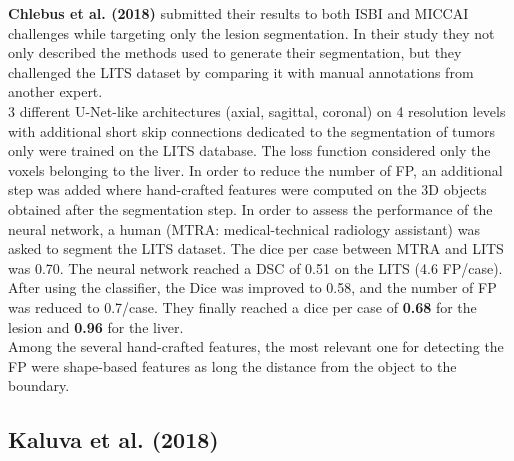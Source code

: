 \textbf{Chlebus et al. (2018)} submitted their results to both ISBI and
MICCAI challenges while targeting only the lesion segmentation. In their
study they not only described the methods used to generate their
segmentation, but they challenged the LITS dataset by comparing it with
manual annotations from another expert.\\
3 different U-Net-like architectures (axial, sagittal, coronal) on 4
resolution levels with additional short skip connections dedicated to
the segmentation of tumors only were trained on the LITS database. The
loss function considered only the voxels belonging to the liver. In
order to reduce the number of FP, an additional step was added where
hand-crafted features were computed on the 3D objects obtained after the
segmentation step. In order to assess the performance of the neural
network, a human (MTRA: medical-technical radiology assistant) was asked
to segment the LITS dataset. The dice per case between MTRA and LITS was
0.70. The neural network reached a DSC of 0.51 on the LITS (4.6
FP/case). After using the classifier, the Dice was improved to 0.58, and
the number of FP was reduced to 0.7/case. They finally reached a dice
per case of \textbf{0.68} for the lesion and \textbf{0.96} for the
liver.\\
Among the several hand-crafted features, the most relevant one for
detecting the FP were shape-based features as long the distance from the
object to the boundary.

\subsection*{Kaluva et al. (2018)}\label{kaluva-et-al.-2018}

